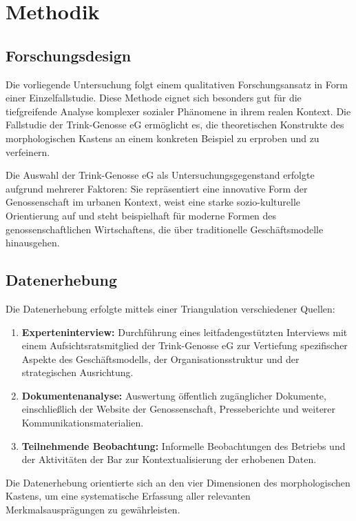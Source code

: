 \section{Methodik}

\subsection{Forschungsdesign}

Die vorliegende Untersuchung folgt einem qualitativen Forschungsansatz in Form einer Einzelfallstudie. Diese Methode eignet sich besonders gut für die tiefgreifende Analyse komplexer sozialer Phänomene in ihrem realen Kontext. Die Fallstudie der Trink-Genosse eG ermöglicht es, die theoretischen Konstrukte des morphologischen Kastens an einem konkreten Beispiel zu erproben und zu verfeinern.

Die Auswahl der Trink-Genosse eG als Untersuchungsgegenstand erfolgte aufgrund mehrerer Faktoren: Sie repräsentiert eine innovative Form der Genossenschaft im urbanen Kontext, weist eine starke sozio-kulturelle Orientierung auf und steht beispielhaft für moderne Formen des genossenschaftlichen Wirtschaftens, die über traditionelle Geschäftsmodelle hinausgehen.

\subsection{Datenerhebung}

Die Datenerhebung erfolgte mittels einer Triangulation verschiedener Quellen:

\begin{enumerate}
\item \textbf{Experteninterview:} Durchführung eines leitfadengestützten Interviews mit einem Aufsichtsratsmitglied der Trink-Genosse eG zur Vertiefung spezifischer Aspekte des Geschäftsmodells, der Organisationsstruktur und der strategischen Ausrichtung.

\item \textbf{Dokumentenanalyse:} Auswertung öffentlich zugänglicher Dokumente, einschließlich der Website der Genossenschaft, Presseberichte und weiterer Kommunikationsmaterialien.

\item \textbf{Teilnehmende Beobachtung:} Informelle Beobachtungen des Betriebs und der Aktivitäten der Bar zur Kontextualisierung der erhobenen Daten.
\end{enumerate}

Die Datenerhebung orientierte sich an den vier Dimensionen des morphologischen Kastens, um eine systematische Erfassung aller relevanten Merkmalsausprägungen zu gewährleisten.

